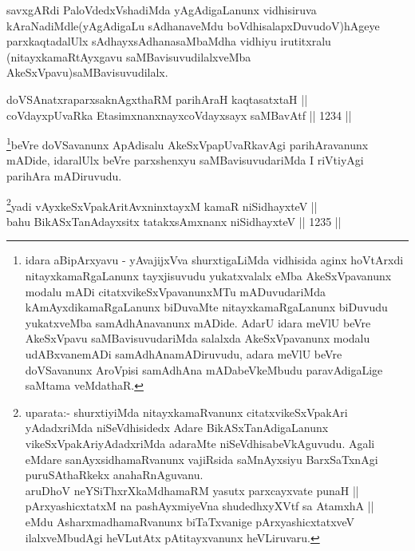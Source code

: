 \begin{artha}
savxgARdi PaloVdedxVshadiMda yAgAdigaLanunx vidhisiruva kAraNadiMdle(yAgAdigaLu sAdhanaveMdu boVdhisalapxDuvudoV)hAgeye parxkaqtadalUlx sAdhayxsAdhanasaMbaMdha vidhiyu irutitxralu (nitayxkamaRtAyxgavu saMBavisuvudilalxveMba AkeSxVpavu)saMBavisuvudilalx.
\end{artha}


\begin{shl}
doVSAnatxraparxsaknAgxthaRM parihAraH kaqtasatxtaH || \\
coVdayxpUvaRka EtasimxnanxnayxcoVdayxsayx saMBavAtf \hfill || 1234 ||   
\end{shl}

\begin{artha}
\footnote{idara aBipArxyavu - yAvajijxVva shurxtigaLiMda vidhisida aginx hoVtArxdi nitayxkamaRgaLanunx tayxjisuvudu yukatxvalalx eMba AkeSxVpavanunx modalu mADi citatxvikeSxVpavanunxMTu mADuvudariMda kAmAyxdikamaRgaLanunx biDuvaMte nitayxkamaRgaLanunx biDuvudu yukatxveMba samAdhAnavanunx mADide. AdarU idara meVlU beVre AkeSxVpavu saMBavisuvudariMda salalxda AkeSxVpavanunx modalu udABxvanemADi samAdhAnamADiruvudu, adara meVlU beVre doVSavanunx AroVpisi samAdhAna mADabeVkeMbudu  paravAdigaLige saMtama veMdathaR.}beVre doVSavanunx ApAdisalu AkeSxVpapUvaRkavAgi parihAravanunx mADide, idaralUlx beVre parxshenxyu saMBavisuvudariMda I riVtiyAgi parihAra mADiruvudu.
\end{artha}



\begin{shl}
\footnote{uparata:- shurxtiyiMda nitayxkamaRvanunx citatxvikeSxVpakAri yAdadxriMda niSeVdhisidedx Adare BikASxTanAdigaLanunx vikeSxVpakAriyAdadxriMda  adaraMte niSeVdhisabeVkAguvudu. Agali eMdare sanAyxsidhamaRvanunx vajiRsida saMnAyxsiyu BarxSaTxnAgi puruSAthaRkekx anahaRnAguvanu.\\
aruDhoV neYSiThxrXkaMdhamaRM yasutx parxcayxvate punaH ||\\
pArxyashicxtatxM na pashAyxmiyeVna shudedhxyXVtf sa AtamxhA ||\\
eMdu AsharxmadhamaRvanunx biTaTxvanige pArxyashicxtatxveV ilalxveMbudAgi heVLutAtx pAtitayxvanunx heVLiruvaru.}yadi vAyxkeSxVpakAritAvxninxtayxM kamaR niSidhayxteV || \\
bahu BikASxTanAdayxsitx tatakxsAmxnanx niSidhayxteV \hfill || 1235 ||  
\end{shl}

